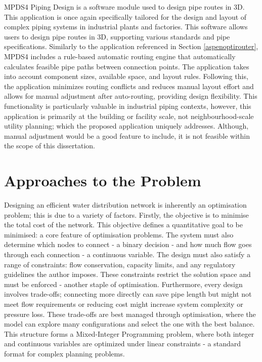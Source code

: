 MPDS4 Piping Design is a software module used to design pipe routes in 3D. This application is once again specifically tailored for the design and layout of complex piping systems in industrial plants and factories. This software allows users to design pipe routes in 3D, supporting various standards and pipe specifications. Similarly to the application referenced in Section \ref{aspenoptirouter}, MPDS4 includes a rule-based automatic routing engine that automatically calculates feasible pipe paths between connection points. The application takes into account component sizes, available space, and layout rules. Following this, the application minimizes routing conflicts and reduces manual layout effort and allows for manual adjustment after auto-routing, providing design flexibility. This functionality is particularly valuable in industrial piping contexts, however, this application is primarily at the building or facility scale, not neighbourhood-scale utility planning; which the proposed application uniquely addresses. Although, manual adjustment would be a good feature to include, it is not feasible within the scope of this dissertation.

\section{Approaches to the Problem}\label{problemapproaches}
Designing an efficient water distribution network is inherently an optimisation problem; this is due to a variety of factors. Firstly, the objective is to minimise the total cost of the network. This objective defines a quantitative goal to be minimised: a core feature of optimisation problems. The system must also determine which nodes to connect - a binary decision - and how much flow goes through each connection - a continuous variable. The design must also satisfy a range of constraints: flow conservation, capacity limits, and any regulatory guidelines the author imposes. These constraints restrict the solution space and must be enforced - another staple of optimisation. Furthermore, every design involves trade-offs; connecting more directly can save pipe length but might not meet flow requirements or reducing cost might increase system complexity or pressure loss. These trade-offs are best managed through optimisation, where the model can explore many configurations and select the one with the best balance. This structure forms a Mixed-Integer Programming problem, where both integer and continuous variables are optimized under linear constraints - a standard format for complex planning problems.

